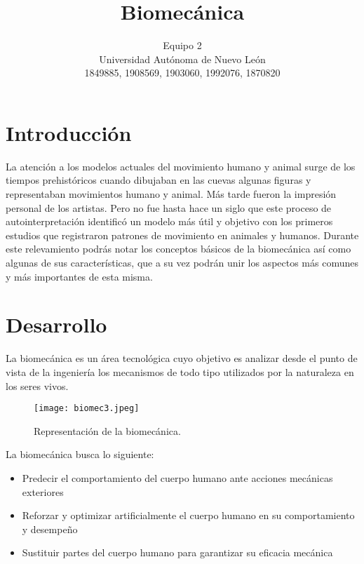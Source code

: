 \documentclass[a4paper]{article}
\title{Biomecánica}
\author{Equipo 2\\
  \small Universidad Autónoma de Nuevo León\\
  \small 1849885, 1908569, 1903060, 1992076, 1870820
  \date{}
}
\begin{document}
\maketitle

\section{Introducci\'on}

La atención a los modelos actuales del movimiento humano y animal surge de los tiempos prehistóricos cuando dibujaban en las cuevas algunas figuras y representaban movimientos humano y animal. Más tarde fueron la impresión personal de los artistas. Pero no fue hasta hace un siglo que este proceso de autointerpretación identificó un modelo más útil y objetivo con los primeros estudios que registraron patrones de movimiento en animales y humanos.
Durante este relevamiento podrás notar los conceptos básicos de la biomecánica así como algunas de sus características, que a su vez podrán unir los aspectos más comunes y más importantes de esta misma.

\section{Desarrollo}

La biomecánica es un área tecnológica cuyo objetivo es analizar desde el punto de vista de la ingeniería los mecanismos de todo tipo utilizados por la naturaleza en los seres vivos.\cite{ff3}

\begin{figure}
\centering
\texttt{[image: biomec3.jpeg]}
\caption{\label{fig:biomec3}Representación de la biomecánica.}
\end{figure}
La biomecánica busca lo siguiente: 
\begin{itemize}
    \item Predecir el comportamiento del cuerpo humano ante acciones mecánicas exteriores
\end{itemize}
\begin{itemize}
    \item Reforzar y optimizar artificialmente el cuerpo humano en su comportamiento y desempeño
\end{itemize}
\begin{itemize}
    \item Sustituir partes del cuerpo humano para garantizar su eficacia mecánica
\end{itemize}
\end{document}
